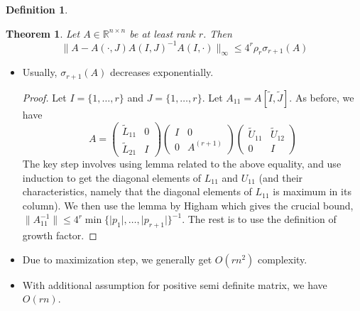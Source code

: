 \documentclass[11pt,reqno]{amsart}
\newtheorem{theorem}{Theorem}
\newtheorem{definition}{Definition}
\theoremstyle{remark}
\begin{document}
\begin{sloppypar}
\begin{definition}
\end{definition}
\begin{theorem}
Let $A\in\mathbb{R}^{n\times n}$ be at least rank $r$. Then 
\[
\lVert A-A(\cdot, J)A(I,J)^{-1}A(I,\cdot)\rVert_{\infty}\leq 4^r \rho_r\sigma_{r+1}(A)  
\]
\end{theorem}
\begin{itemize}
\item Usually, $\sigma_{r+1}(A)$ decreases exponentially.
\begin{proof}
Let $I=\{1,\dots,r\}$ and $J=\{1,\dots,r\}$. Let $A_{11}=A[\tilde I, \tilde J]$.
As before, we have 
\[A=
\begin{pmatrix}
\tilde L_{11} & 0\\
\tilde L_{21} & I
\end{pmatrix}
\begin{pmatrix}
I & 0\\
0 & A^{(r+1)}
\end{pmatrix}
\begin{pmatrix}
\tilde U_{11} & \tilde U_{12}\\
0 & I
\end{pmatrix}
\]
The key step involves using lemma related to the above equality, and use induction to get the diagonal elements of $L_{11}$ and $U_{11}$ (and their characteristics, namely that the diagonal elements of $L_{11}$ is maximum in its column).
We then use the lemma by Higham which gives the crucial bound, $\lVert A_{11}^{-1}\rVert\leq 4^r\min\{\lvert p_1\rvert,\dots,\lvert p_{r+1}\rvert\}^{-1}$. The rest is to use the definition of growth factor.
\end{proof}

\item Due to maximization step, we generally get $O(rn^2)$ complexity.
\item With additional assumption for positive semi definite matrix, we have $O(rn)$.
\end{itemize}

\end{sloppypar}
\end{document}
